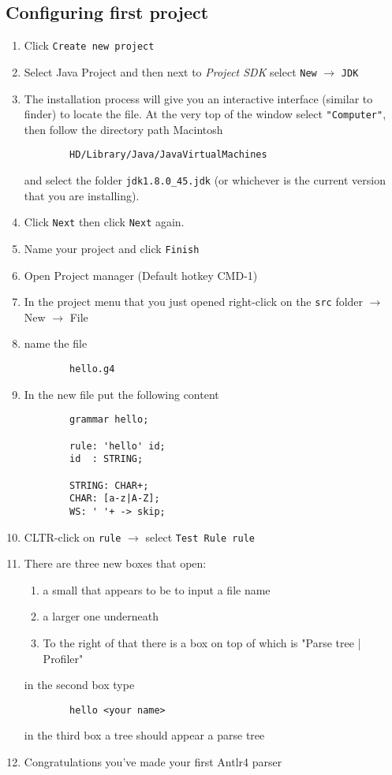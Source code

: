 \documentclass[../setup.tex]{subfiles}
\begin{document}
  \subsection{Configuring first project}
    \begin{enumerate}
      \item Click \texttt{Create new project}
      \item Select Java Project and then next to \textit{Project SDK} select \texttt{New} $\rightarrow$ \texttt{JDK}
      \item The installation process will give you an interactive interface (similar to finder) to locate the
      file. At the very top of the window select \texttt{"Computer"}, then follow the directory path Macintosh
      \begin{lstlisting}
        HD/Library/Java/JavaVirtualMachines
      \end{lstlisting}
      and select the folder \texttt{jdk1.8.0\_45.jdk} (or whichever is the current version that you are
      installing).
      \item Click \texttt{Next} then click \texttt{Next} again.
      \item Name your project and click \texttt{Finish}
      \item Open Project manager (Default hotkey CMD-1)
      \item In the project menu that you just opened right-click on the \texttt{src} folder $\rightarrow$ New $\rightarrow$ File
      \item name the file
      \begin{lstlisting}
        hello.g4
      \end{lstlisting}
      \item In the new file put the following content
      \begin{lstlisting}
        grammar hello;

        rule: 'hello' id;
        id  : STRING;

        STRING: CHAR+;
        CHAR: [a-z|A-Z];
        WS: ' '+ -> skip;
      \end{lstlisting}
      \item CLTR-click on \texttt{rule} $\rightarrow$ select \texttt{Test Rule rule}
      \item There are three new boxes that open:
      \begin{enumerate}
        \item a small that appears to be to input a file name
        \item a larger one underneath
        \item To the right of that there is a box on top of which is "Parse tree | Profiler"
      \end{enumerate}
      in the second box type
      \begin{lstlisting}
        hello <your name>
      \end{lstlisting}
      in the third box a tree should appear a parse tree
      \item Congratulations you've made your first Antlr4 parser

    \end{enumerate}
\end{document}
